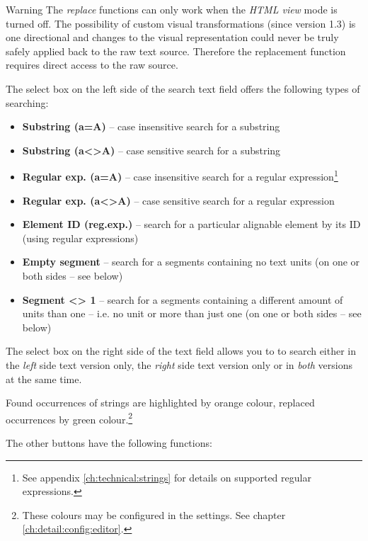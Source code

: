 \documentclass[a4paper,10pt,oneside]{book}
\begin{document}
\medskip
\begin{bclogo}[couleur = blue!30, arrondi = 0.1, logo = \bcattention,
ombre = true , epOmbre = 0.125, couleurOmbre = black!30, blur, epBord = 0.3, marge = 5]{Warning}\small
The \emph{replace} functions can only work when the \emph{HTML view} mode is turned off. The possibility of custom visual transformations (since version 1.3) is one directional and changes to the visual representation could never be truly safely applied back to the raw text source. Therefore the replacement function requires direct access to the raw source.
\end{bclogo}
\medskip

The select box on the left side of the search text field offers the following types of searching:

\begin{itemize}
 \item \textbf{Substring (a=A)} -- case insensitive search for a substring
 \item \textbf{Substring (a<>A)} -- case sensitive search for a substring
 \item \textbf{Regular exp. (a=A)} -- case insensitive search for a regular expression\footnote{See appendix \ref{ch:technical:strings} for details on supported regular expressions.}
 \item \textbf{Regular exp. (a<>A)} -- case sensitive search for a regular expression
 \item \textbf{Element ID (reg.exp.)} -- search for a particular alignable element by its ID (using regular expressions)
 \item \textbf{Empty segment} -- search for a segments containing no text units (on one or both sides -- see below)
 \item \textbf{Segment <> 1} -- search for a segments containing a different amount of units than one -- i.e. no unit or more than just one (on one or both sides -- see below)
\end{itemize}

The select box on the right side of the text field allows you to to search either in the \emph{left} side text version only, the \emph{right} side text version only or in \emph{both} versions at the same time.

Found occurrences of strings are highlighted by orange colour, replaced occurrences by green colour.\footnote{These colours may be configured in the settings. See chapter \ref{ch:detail:config:editor}.}

The other buttons have the following functions:
\end{document}
